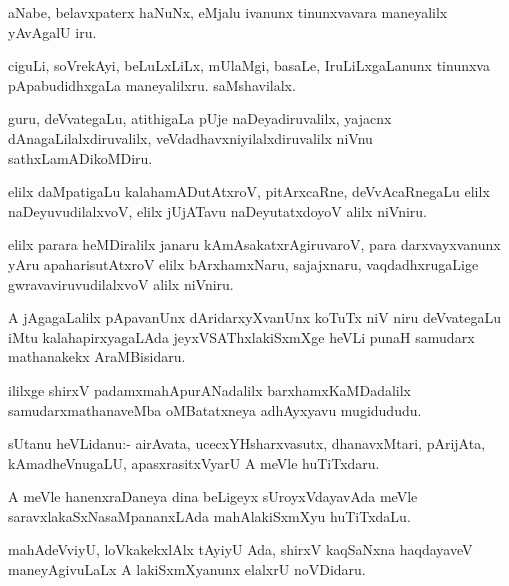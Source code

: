 \begin{mng}
aNabe, belavxpaterx haNuNx, eMjalu ivanunx tinunxvavara maneyalilx yAvAgalU iru.
\end{mng}

\begin{mng}
ciguLi, soVrekAyi, beLuLxLiLx, mUlaMgi, basaLe, IruLiLxgaLanunx tinunxva pApabudidhxgaLa maneyalilxru. saMshavilalx.
\end{mng}

\begin{mng}
guru, deVvategaLu, atithigaLa pUje naDeyadiruvalilx, yajacnx dAnagaLilalxdiruvalilx, veVdadhavxniyilalxdiruvalilx niVnu sathxLamADikoMDiru.
\end{mng}

\begin{mng}
elilx daMpatigaLu kalahamADutAtxroV, pitArxcaRne, deVvAcaRnegaLu elilx naDeyuvudilalxvoV, elilx jUjATavu naDeyutatxdoyoV alilx niVniru.
\end{mng}

\begin{mng}
elilx parara heMDiralilx janaru kAmAsakatxrAgiruvaroV, para darxvayxvanunx yAru apaharisutAtxroV elilx bArxhamxNaru, sajajxnaru, vaqdadhxrugaLige gwravaviruvudilalxvoV alilx niVniru.
\end{mng}

\begin{mng}
A jAgagaLalilx pApavanUnx dAridarxyXvanUnx koTuTx niV niru deVvategaLu iMtu kalahapirxyagaLAda jeyxVSAThxlakiSxmXge heVLi punaH samudarx mathanakekx AraMBisidaru.
\end{mng}

\begin{mng}
ililxge shirxV padamxmahApurANadalilx barxhamxKaMDadalilx samudarxmathanaveMba oMBatatxneya adhAyxyavu mugidududu.
\end{mng}

\begin{mng}
sUtanu heVLidanu:- airAvata, ucecxYHsharxvasutx, dhanavxMtari, pArijAta, kAmadheVnugaLU, apasxrasitxVyarU A meVle huTiTxdaru.
\end{mng}

\begin{mng}
A meVle hanenxraDaneya dina beLigeyx sUroyxVdayavAda meVle saravxlakaSxNasaMpananxLAda mahAlakiSxmXyu huTiTxdaLu.
\end{mng}

\begin{mng}
mahAdeVviyU, loVkakekxlAlx tAyiyU Ada, shirxV kaqSaNxna haqdayaveV maneyAgivuLaLx A lakiSxmXyanunx elalxrU noVDidaru.
\end{mng}

